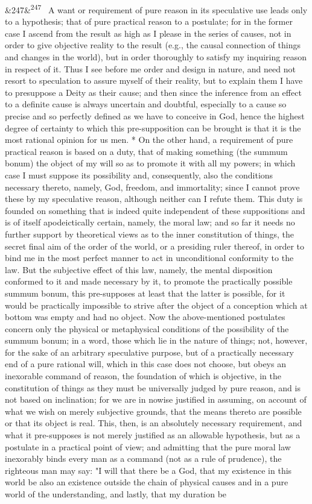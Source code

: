 \documentclass[12pt]{article}
\newcommand{\para}[1][]{\par\noindent\ifx&#1&\else\textsuperscript{\footnotesize #1}~\fi}
\begin{document}
\para[247] A want or requirement of pure reason in its speculative use leads only to a hypothesis; that of pure practical reason to a postulate; for in the former case I ascend from the result as high as I please in the series of causes, not in order to give objective reality to the result (e.g., the causal connection of things and changes in the world), but in order thoroughly to satisfy my inquiring reason in respect of it. Thus I see before me order and design in nature, and need not resort to speculation to assure myself of their reality, but to explain them I have to presuppose a Deity as their cause; and then since the inference from an effect to a definite cause is always uncertain and doubtful, especially to a cause so precise and so perfectly defined as we have to conceive in God, hence the highest degree of certainty to which this pre-supposition can be brought is that it is the most rational opinion for us men. * On the other hand, a requirement of pure practical reason is based on a duty, that of making something (the summum bonum) the object of my will so as to promote it with all my powers; in which case I must suppose its possibility and, consequently, also the conditions necessary thereto, namely, God, freedom, and immortality; since I cannot prove these by my speculative reason, although neither can I refute them. This duty is founded on something that is indeed quite independent of these suppositions and is of itself apodeictically certain, namely, the moral law; and so far it needs no further support by theoretical views as to the inner constitution of things, the secret final aim of the order of the world, or a presiding ruler thereof, in order to bind me in the most perfect manner to act in unconditional conformity to the law. But the subjective effect of this law, namely, the mental disposition conformed to it and made necessary by it, to promote the practically possible summum bonum, this pre-supposes at least that the latter is possible, for it would be practically impossible to strive after the object of a conception which at bottom was empty and had no object. Now the above-mentioned postulates concern only the physical or metaphysical conditions of the possibility of the summum bonum; in a word, those which lie in the nature of things; not, however, for the sake of an arbitrary speculative purpose, but of a practically necessary end of a pure rational will, which in this case does not choose, but obeys an inexorable command of reason, the foundation of which is objective, in the constitution of things as they must be universally judged by pure reason, and is not based on inclination; for we are in nowise justified in assuming, on account of what we wish on merely subjective grounds, that the means thereto are possible or that its object is real. This, then, is an absolutely necessary requirement, and what it pre-supposes is not merely justified as an allowable hypothesis, but as a postulate in a practical point of view; and admitting that the pure moral law inexorably binds every man as a command (not as a rule of prudence), the righteous man may say: "I will that there be a God, that my existence in this world be also an existence outside the chain of physical causes and in a pure world of the understanding, and lastly, that my duration be 
\end{document}
